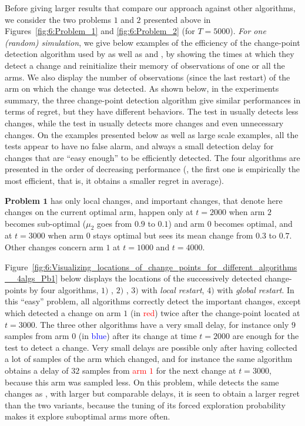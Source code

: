 Before giving larger results that compare our approach against other algorithms, we consider the two problems $1$ and $2$ presented above in Figures~\ref{fig:6:Problem_1} and \ref{fig:6:Problem_2} (for $T=5000$).
\emph{For one (random) simulation}, we give below examples of the efficiency of the change-point detection algorithm used by \GLRklUCB{} as well as \CUSUMklUCB{} and \MklUCB,
by showing the times at which they detect a change and reinitialize their memory of observations of one or all the arms.
We also display the number of observations (since the last restart) of the arm on which the change was detected.
As shown below, in the experiments summary, the three change-point detection algorithm give similar performances in terms of regret, but they have different behaviors.
The test in \MUCB{} usually detects less changes, while the test in \CUSUMUCB{} usually detects more changes and even unnecessary changes.
%
On the examples presented below as well as large scale examples, all the tests appear to have no false alarm, and always a small detection delay for changes that are ``easy enough'' to be efficiently detected.
The four algorithms are presented in the order of decreasing performance (\ie, the first one is empirically the most efficient, that is, it obtains a smaller regret in average).



\textbf{Problem $\bm{1}$} has only local changes, and important changes, that denote here changes on the current optimal arm, happen only at $t=2000$ when arm $2$ becomes sub-optimal ($\mu_2$ goes from $0.9$ to $0.1$) and arm $0$ becomes optimal, and at $t=3000$ when arm $0$ stays optimal but sees its mean change from $0.3$ to $0.7$.
Other changes concern arm $1$ at $t=1000$ and $t=4000$.

Figure~\ref{fig:6:Visualizing_locations_of_change_points_for_different_algorithms__4algs_Pb1} below displays the locations of the successively detected change-points by four algorithms,
$1)$ \MklUCB,
$2)$ \CUSUMklUCB,
$3)$ \GLRklUCB{} with \emph{local restart},
$4)$ \GLRklUCB{} with \emph{global restart}.
In this ``easy'' problem, all algorithms correctly detect the important changes, except \CUSUM{} which detected a change on arm $1$ (in \textcolor{red}{red}) twice after the change-point located at $t=3000$.
The three other algorithms have a very small delay, for instance only $9$ samples from arm $0$ (in \textcolor{blue}{blue}) after its change at time $t=2000$ are enough for the \GLR{} test to detect a change.
Very small delays are possible only after having collected a lot of samples of the arm which changed, and for instance the same algorithm obtains a delay of $32$ samples from \textcolor{red}{arm $1$} for the next change at $t=3000$, because this arm was sampled less.
On this problem, while \MklUCB{} detects the same changes as \GLRklUCB, with larger but comparable delays, it is seen to obtain a larger regret than the two \GLR{} variants, because the tuning of its forced exploration probability makes it explore suboptimal arms more often.

